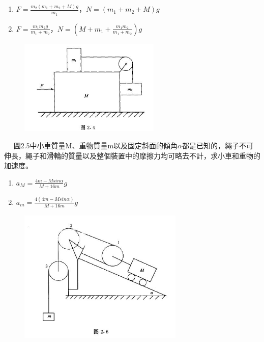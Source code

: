 \documentclass[cn,10pt,math=newtx,chinesefont=founder]{../elegantbook}
\begin{document}
\begin{solution}
\begin{enumerate}[label=(\arabic*)]
\item $F=\frac{m_2(m_1+m_2+M)g}{m_1}$，$N=(m_1+m_2+M)g$
\item $F=\frac{m_1m_2g}{m_1+m_2}$，$N=(M+m_1+\frac{m_1m_2}{m_1+m_2})g$
\end{enumerate}
\end{solution}

\begin{figure}[htbp]
\flushright
\includegraphics[width=0.6\textwidth]{image/2.4.JPG}
\end{figure}

\newpage

    
\begin{example}　
    圖2.5中小車質量M、重物質量m以及固定斜面的傾角$\alpha$都是已知的，繩子不可伸長，繩子和滑輪的質量以及整個裝置中的摩擦力均可略去不計，求小車和重物的加速度。
    
    \rightline{[2.1.5]}
\end{example}

\begin{solution}
\begin{enumerate}[label=(\arabic*)]
\item $a_M = \frac{4m-Msin\alpha}{M+16m}g$
\item $a_m = \frac{4(4m-Msin\alpha)}{M+16m}g$
\end{enumerate}
\end{solution}

\begin{figure}[htbp]
\flushright
\includegraphics[width=0.7\textwidth]{image/2.5.JPG}
\end{figure}
\end{document}
